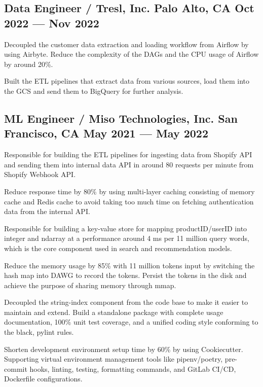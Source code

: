 \subsection{{Data Engineer / Tresl, Inc. \hfill Palo Alto, CA \> Oct 2022 --- Nov 2022}}
\begin{zitemize}
\item Decoupled the customer data extraction and loading workflow from Airflow by using Airbyte. Reduce the complexity of the DAGs and the CPU usage of Airflow by around 20\%.
\item Built the ETL pipelines that extract data from various sources, load them into the GCS and send them to BigQuery for further analysis.
\end{zitemize}


\subsection{{ML Engineer / Miso Technologies, Inc.  \hfill San Francisco, CA \> May 2021 --- May 2022}}

\begin{zitemize}
\item Responsible for building the ETL pipelines for ingesting data from Shopify API and sending them into internal data API in around 80 requests per minute from Shopify Webhook API.
\item Reduce response time by 80\% by using multi-layer caching consisting of memory cache and Redis cache to avoid taking too much time on fetching authentication data from the internal API.
\end{zitemize}


\begin{zitemize}
\item Responsible for building a key-value store for mapping productID/userID into integer and ndarray at a performance around 4 ms per 11 million query words, which is the core component used in search and recommendation models.
\item Reduce the memory usage by 85\% with 11 million tokens input by switching the hash map into DAWG to record the tokens. Persist the tokens in the disk and achieve the purpose of sharing memory through mmap.
\item Decoupled the string-index component from the code base to make it easier to maintain and extend. Build a standalone package with complete usage documentation, 100\% unit test coverage, and a unified coding style conforming to the black, pylint rules.
\end{zitemize}

\begin{zitemize}
\item Shorten development environment setup time by 60\% by using Cookiecutter. Supporting virtual environment management tools like pipenv/poetry, pre-commit hooks, linting, testing, formatting commands, and GitLab CI/CD, Dockerfile configurations.
\end{zitemize}


